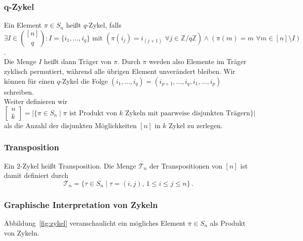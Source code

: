 \documentclass[12pt, german]{article}
\begin{document}
	\subsubsection{q-Zykel}
	Ein Element $\pi \in S_n$ hei\ss t $q$-Zykel, falls $$ \exists I \in \binom{[n]}{q}: I=\{i_1,\ldots, i_q\} \text{ mit } (\pi(i_j) = i_{(j+1)}\,\, \forall j \in \mathbb Z / q \mathbb Z) \wedge (\pi(m)= m \,\, \forall m \in [n]  \setminus  I)$$. \\ 
	Die Menge $I$ hei\ss t dann Träger von $\pi$.
	Durch $\pi$ werden also Elemente im Träger zyklisch permutiert, während alle übrigen Element unverändert bleiben.
	Wir können für einen $q$-Zykel die Folge $(i_1, \ldots, i_q) = (i_{p+1}, \ldots, i_q, i_1, \ldots, i_p)$ schreiben.\\
	
	Weiter definieren wir $$\left[\begin{array}{c}n\\k\end{array}\right] = |\{ \pi \in S_n \mid \pi \text{ ist Produkt von $k$ Zykeln  mit paarweise disjunkten Trägern} \}|$$
	als die Anzahl der disjunkten Möglichkeiten $[n]$ in $k$ Zykel zu zerlegen.
	
	
	\subsubsection{Transposition}
	Ein $2$-Zykel hei\ss t Transposition.
	Die Menge $\mathcal T_n$ der Transpositionen von $[n]$ ist damit definiert durch  $$\mathcal T_n = \{ \tau \in S_n  \mid \tau = (i, j), \, 1 \leq i \leq j \leq n \}\,.$$
	
	\subsubsection{Graphische Interpretation von Zykeln}
	Abbildung~\ref{fig:zykel} veranschaulicht ein mögliches Element $\pi \in S_n$ als Produkt von Zykeln.
	
\end{document}
